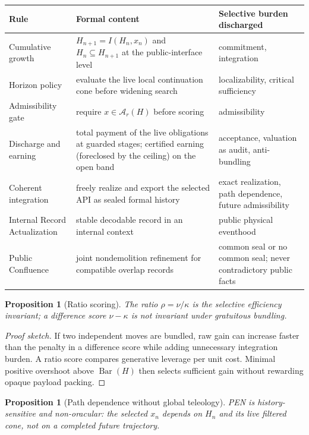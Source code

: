 \documentclass[11pt]{article}
\theoremstyle{plain}
\newtheorem{proposition}[theorem]{Proposition}
\theoremstyle{definition}
\theoremstyle{remark}
\newenvironment{proofsketch}{\begin{proof}[Proof sketch]}{\end{proof}}
\newcommand{\A}{\mathcal{A}}
\newcommand{\SelBar}{\operatorname{Bar}}
\begin{document}
\begin{center}
\small
\begin{tabularx}{\textwidth}{l Y Y}
\toprule
Rule & Formal content & Selective burden discharged \\
\midrule
Cumulative growth & \(H_{n+1}=I(H_n,x_n)\) and \(H_n\subseteq H_{n+1}\) at the public-interface level & commitment, integration \\
Horizon policy & evaluate the live local continuation cone before widening search & localizability, critical sufficiency \\
Admissibility gate & require \(x\in\A_r(H)\) before scoring & admissibility \\
Discharge and earning & total payment of the live obligations at guarded stages; certified earning (foreclosed by the ceiling) on the open band & acceptance, valuation as audit, anti-bundling \\
Coherent integration & freely realize and export the selected API as sealed formal history & exact realization, path dependence, future admissibility \\
Internal Record Actualization & stable decodable record in an internal context & public physical eventhood \\
Public Confluence & joint nondemolition refinement for compatible overlap records & common seal or no common seal; never contradictory public facts \\
\bottomrule
\end{tabularx}
\end{center}

\begin{proposition}[Ratio scoring]
The ratio \(\rho=\nu/\kappa\) is the selective efficiency invariant; a difference score \(\nu-\kappa\) is not invariant under gratuitous bundling.
\end{proposition}

\begin{proofsketch}
If two independent moves are bundled, raw gain can increase faster than the penalty in a difference score while adding unnecessary integration burden. A ratio score compares generative leverage per unit cost. Minimal positive overshoot above \(\SelBar(H)\) then selects sufficient gain without rewarding opaque payload packing.
\end{proofsketch}

\begin{proposition}[Path dependence without global teleology]
PEN is history-sensitive and non-oracular: the selected \(x_n\) depends on \(H_n\) and its live filtered cone, not on a completed future trajectory.
\end{proposition}
\end{document}
